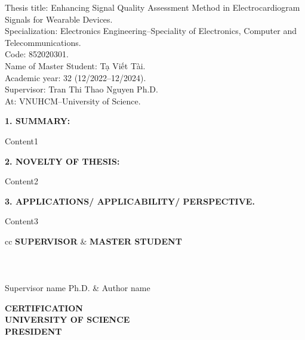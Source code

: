 \begin{flushleft}
	Thesis title: Enhancing Signal Quality Assessment Method in Electrocardiogram Signals for Wearable Devices. \\
	Specialization: Electronics Engineering--Speciality of Electronics, Computer and Telecommunications. \\
	Code: 852020301. \\
	Name of Master Student: Tạ Viết Tài. \\
	Academic year: 32 (12/2022--12/2024). \\
	Supervisor: Tran Thi Thao Nguyen Ph.D.\\
	At: VNUHCM--University of Science.\\
\end{flushleft}

\textbf{1. SUMMARY:}

Content1

\textbf{2. NOVELTY OF THESIS:}

Content2

\textbf{3. APPLICATIONS/ APPLICABILITY/ PERSPECTIVE.}

Content3


\vspace{1.5em}
\begin{tblr}{cc}
	\centering
	\textbf{SUPERVISOR}   & \textbf{\hspace{8.0em}MASTER STUDENT} \\
	\\
	\\
	\\
	Supervisor name Ph.D. & \hspace{8.0em} Author name
\end{tblr}

\vspace{2.5em}
\begin{center}
	\textbf{CERTIFICATION}\\
	\textbf{UNIVERSITY OF SCIENCE} \\
	\textbf{PRESIDENT}
\end{center}
